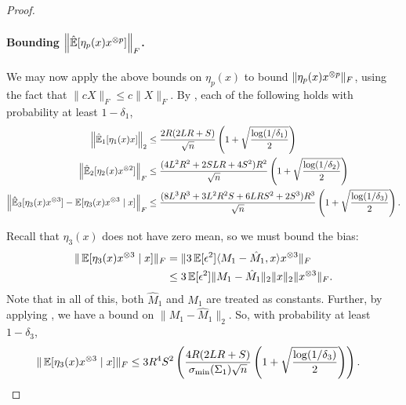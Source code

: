 \begin{proof}
\paragraph{Bounding $\left\| \hat{\operatorname{\mathbb{E}}}[\eta_p(x)x^{\otimes p}] \right\|_F$.}
We may now apply the above bounds on $\eta_p(x)$ to bound $\|\eta_p(x) x^{\otimes p}\|_F$, using the fact that $\|c X\|_F \le c\|X\|_F$.
By , each of the following holds with probability at least $1-\delta_1$,
\begin{align*}
    \left\|\hat{\operatorname{\mathbb{E}}}_1[\eta_1(x) x] \right\|_2
    &\le \frac{2R (2LR + S)}{\sqrt{n}} \left( 1 + \sqrt{\frac{\log(1/\delta_1)}{2}} \right) \\
  \left\|\hat{\operatorname{\mathbb{E}}}_2[\eta_2(x) x^{\otimes 2}] \right\|_F
      &\le \frac{(4L^2 R^2 + 2 S L R + 4S^2)R^2}{\sqrt{n}} \left( 1 + \sqrt{\frac{\log(1/\delta_2)}{2}} \right) \\
  \left\|\hat{\operatorname{\mathbb{E}}}_3[\eta_3(x) x^{\otimes 3}] - \operatorname{\mathbb{E}}[\eta_3(x) x^{\otimes 3} \mid x] \right\|_F
      &\le \frac{(8L^3 R^3 + 3 L^2 R^2 S + 6 L R S^2 + 2S^3) R^3}{\sqrt{n}} \left( 1 + \sqrt{\frac{\log(1/\delta_3)}{2}} \right).
\end{align*}

Recall that $\eta_3(x)$ does not have zero mean, so we must bound the bias:
\begin{align*}
  \| \operatorname{\mathbb{E}}[\eta_3(x) x^{\otimes 3} \mid x] \|_F &= \|3 \operatorname{\mathbb{E}}[\epsilon^2] \langle M_1 - \hat M_1, x \rangle x^{\otimes 3} \|_F \\
    &\le 3 \operatorname{\mathbb{E}}[\epsilon^2] \|M_1 - \hat M_1\|_2 \|x\|_2 \|x^{\otimes 3}\|_F.
\end{align*}
Note that in all of this, both $\hat M_1$ and $M_1$ are treated as
constants. Further, by applying , we have a bound on $\|M_1 - \hat
M_1\|_2$. So, with probability at least $1 - \delta_3$,
\begin{align*}
  \| \operatorname{\mathbb{E}}[\eta_3(x) x^{\otimes 3} \mid x] \|_F
  &\le 3 R^4 S^2 \left(\frac{4R(2LR+S)}{\sigma_\text{\rm min}(\Sigma_1) \sqrt{n}} \left(1 + \sqrt{\frac{\log(1/\delta_3)}{2}} \right) \right).
\end{align*}


\end{proof}
